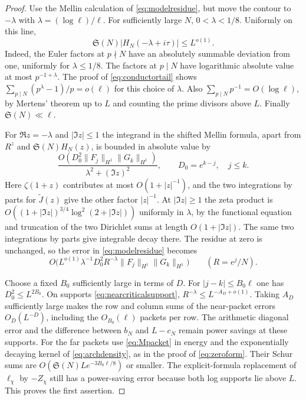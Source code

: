\documentclass[11pt,a4paper]{article}
\numberwithin{equation}{section}
\newcommand{\SSS}{\mathfrak S}
\begin{document}
\begin{proof}
Use the Mellin calculation of \cref{eq:modelresidue},
but move the contour to $-\lambda$ with
$\lambda=(\log\ell)/\ell$. For sufficiently large $N$,
$0<\lambda<1/8$. Uniformly on this line,
\begin{equation}
 \SSS(N)|H_N(-\lambda+i\tau)|\le L^{o(1)}.
 \label{eq:movingcontoureuler}
\end{equation}
Indeed, the Euler factors at $p\nmid N$ have an absolutely
summable deviation from one, uniformly for $\lambda\le1/8$.
The factors at $p\mid N$ have logarithmic absolute value
at most $p^{-1+\lambda}$.
The proof of \cref{eq:conductortail} shows
$\sum_{p\mid N}(p^\lambda-1)/p=o(\ell)$ for this choice of
$\lambda$. Also $\sum_{p\mid N}p^{-1}=O(\log\ell)$,
by Mertens' theorem up to $L$ and counting the prime
divisors above $L$. Finally $\SSS(N)\ll\ell$.

For $\Re z=-\lambda$ and $|\Im z|\le1$ the integrand
in the shifted Mellin formula, apart from $R^{z}$ and
$\SSS(N)H_N(z)$, is bounded in absolute value by
\[
 \frac{O(D_0^2\|F_j\|_{H^1}\|G_k\|_{H^1})}
      {\lambda^2+(\Im z)^2},\qquad D_0=e^{k-j},\quad j\le k .
\]
Here $\zeta(1+z)$ contributes at most $O(1+|z|^{-1})$,
and the two integrations by parts for $\widetilde J(z)$
give the other factor $|z|^{-1}$. At $|\Im z|\ge1$ the
zeta product is $O((1+|\Im z|)^{3/4}\log^2(2+|\Im z|))$
uniformly in $\lambda$, by the functional equation and
truncation of the two Dirichlet sums at length
$O(1+|\Im z|)$. The same two integrations by parts
give integrable decay there. The residue at zero is
unchanged, so the error in \cref{eq:modelresidue} becomes
\[
 O\bigl(L^{o(1)}\lambda^{-1}D_0^2 R^{-\lambda}
                   \|F_j\|_{H^1}\|G_k\|_{H^1}\bigr)
 \qquad (R=e^j/N).
\]

Choose a fixed $B_0$ sufficiently large in terms of $D$.
For $|j-k|\le B_0\ell$ one has $D_0^2\le L^{2B_0}$.
On supports \eqref{eq:nearcriticalsupport},
$R^{-\lambda}\le L^{-A_D+o(1)}$. Taking $A_D$
sufficiently large makes the row and column sums of
the near-packet errors $O_D(L^{-D})$, including the
$O_{B_0}(\ell)$ packets per row. The arithmetic diagonal
error and the difference between $b_N$ and $L-c_N$
remain power savings at these supports.
For the far packets use \cref{eq:Mpacket} in energy
and the exponentially decaying kernel of
\cref{eq:archdensity}, as in the proof of
\cref{eq:zeroform}. Their Schur sums are
$O(\SSS(N)L e^{-3B_0\ell/8})$ or smaller.
The explicit-formula replacement of $\ell_\chi$ by
$-Z_\chi$ still has a power-saving error because both log
supports lie above $L$. This proves the first assertion.


\end{proof}
\end{document}
